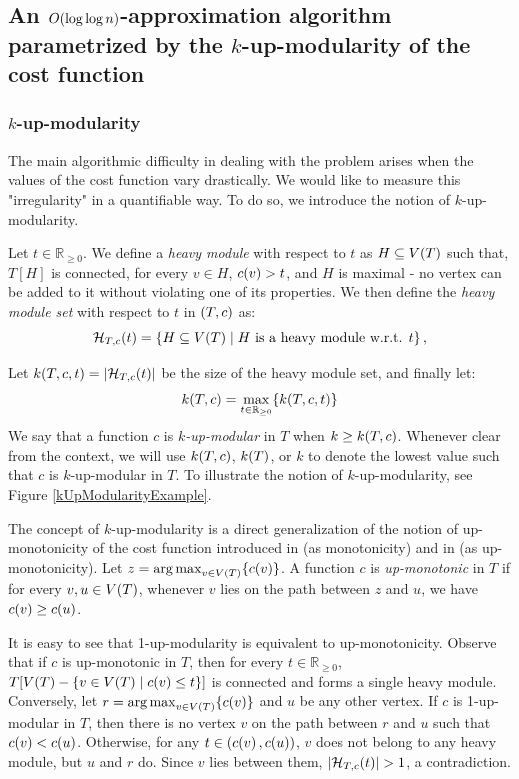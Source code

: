 

\subsection{An $O\mathopen{}\left( \log\log n \right)$-approximation algorithm parametrized by the $k$-up-modularity of the cost function}
\label{sec:log_log_n_approx}
\subsubsection{$k$-up-modularity}\label{kUpModularity}
The main algorithmic difficulty in dealing with the problem arises when the values of the cost function vary drastically. We would like to measure this "irregularity" in a quantifiable way. To do so, we introduce the notion of $k$-up-modularity.


Let $t\in\mathbb{R}_{\geq0}$. We define a \textit{heavy module} with respect to $t$ as $H\subseteq V\mathopen{}\left( T \right)$ such that, $T[H]$ is connected, for every $v \in H$, $c\mathopen{}\left( v \right) > t$, and $H$ is maximal - no vertex can be added to it without violating one of its properties. We then define the \textit{heavy module set} with respect to $t$ in $\mathopen{}\left( T,c \right)$ as:
$$
\mathcal{H}_{T,c}\mathopen{}\left( t \right)=\mathopen{}\left\{ H\subseteq V\mathopen{}\left( T \right)\mid H \text{ is a heavy module w.r.t. } t \right\},
$$

Let $k\mathopen{}\left( T,c, t \right) = \mathopen{}\left| \mathcal{H}_{T,c}\mathopen{}\left( t \right) \right|$ be the size of the heavy module set, and finally let:
$$
k\mathopen{}\left( T,c \right)= \max_{t\in\mathbb{R}_{\geq 0}}\mathopen{}\left\{ k\mathopen{}\left( T,c, t \right) \right\}
$$ 
We say that a function $c$ is $k$\textit{-up-modular} in $T$ when $k\geq k\mathopen{}\left( T,c \right)$. Whenever clear from the context, we will use $k\mathopen{}\left( T,c \right)$, $k\mathopen{}\left( T \right)$, or $k$ to denote the lowest value such that $c$ is $k$-up-modular in $T$. To illustrate the notion of $k$-up-modularity, see Figure \ref{kUpModularityExample}.

The concept of $k$-up-modularity is a direct generalization of the notion of up-monotonicity of the cost function introduced in \cite{dereniowski2022CFApproxAlgForBSInTsWithMonoQTimes} (as monotonicity) and in \cite{dereniowski2024SInTsMonoQTs} (as up-monotonicity). Let $z=\operatorname*{arg\,max}_{v\in V\mathopen{}\left( T \right)}\mathopen{}\left\{ c\mathopen{}\left( v \right) \right\}$. A function $c$ is \textit{up-monotonic} in $T$ if for every $v,u\in V\mathopen{}\left( T \right)$, whenever $v$ lies on the path between $z$ and $u$, we have $c\mathopen{}\left( v \right)\geq c\mathopen{}\left( u \right)$. 

It is easy to see that 1-up-modularity is equivalent to up-monotonicity. Observe that if $c$ is up-monotonic in $T$, then for every $t\in\mathbb{R}_{\geq 0}$, $T[V\mathopen{}\left( T \right)-\mathopen{}\left\{ v\in V\mathopen{}\left( T \right)\mid c\mathopen{}\left( v \right)\leq t \right\}]$ is connected and forms a single heavy module. Conversely, let $r=\operatorname*{arg\,max}_{v\in V\mathopen{}\left( T \right)}\mathopen{}\left\{ c\mathopen{}\left( v \right) \right\}$ and $u$ be any other vertex. If $c$ is 1-up-modular in $T$, then there is no vertex $v$ on the path between $r$ and $u$ such that $c\mathopen{}\left( v \right)<c\mathopen{}\left( u \right)$. Otherwise, for any $t\in \mathopen{}\left( c\mathopen{}\left( v \right),c\mathopen{}\left( u \right) \right)$, $v$ does not belong to any heavy module, but $u$ and $r$ do. Since $v$ lies between them, $\spr{\mathcal{H}_{T,c}\br{t}}>1$, a contradiction.



